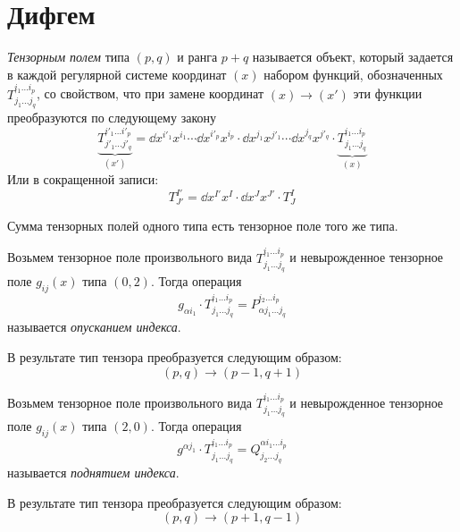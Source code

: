 \documentclass{article}
\begin{document}
\section{Дифгем}
\begin{definition}
    \emph{Тензорным полем} типа $(p, q)$ и ранга $p+q$ называется объект, который задается в каждой регулярной системе координат $(x)$ набором функций, обозначенных $T_{j_1 \ldots j_q}^{i_1 \ldots i_p}$, со свойством, что при замене координат $(x)\to (x')$ эти функции преобразуются по следующему закону
    $$\underbrace{T_{j'_1 \ldots j'_q}^{i'_1 \ldots i'_p}}_{(x')} = \dd{x^{i'_1}}{x^{i_1}} \cdots \dd{x^{i'_p}}{x^{i_p}} \cdot \dd{x^{j_1}}{x^{j'_1}} \cdots \dd{x^{j_q}}{x^{j'_q}} \cdot \underbrace{T_{j_1 \ldots j_q}^{i_1 \ldots i_p}}_{(x)}$$
    Или в сокращенной записи:
    $$T_{J'}^{I'} = \dd{x^{I'}}{x^I} \cdot \dd{x^J}{x^{J'}} \cdot T_J^I$$
\end{definition}


\begin{theorem}
    Сумма тензорных полей одного типа есть тензорное поле того же типа.
\end{theorem}


\begin{definition}
    Возьмем тензорное поле произвольного вида $T_{j_1 \ldots j_q}^{i_1 \ldots i_p}$
    и невырожденное тензорное поле $g_{ij}(x)$ типа $(0,2)$. Тогда операция
    $$g_{\alpha i_1} \cdot T_{j_1 \ldots j_q}^{i_1 \ldots i_p} = P_{\alpha j_1 \ldots j_q}^{i_2 \ldots i_p}$$
    называется \emph{опусканием индекса}.

    В результате тип тензора преобразуется следующим образом:
    $$(p,q) \to (p-1, q+1)$$
\end{definition}

\begin{definition}
    Возьмем тензорное поле произвольного вида $T_{j_1 \ldots j_q}^{i_1 \ldots i_p}$ и невырожденное тензорное поле $g_{ij}(x)$ типа $(2,0)$. Тогда операция
    $$g^{\alpha j_1} \cdot T_{j_1 \ldots j_q}^{i_1 \ldots i_p} = Q_{j_2 \ldots j_q}^{\alpha i_1 \ldots i_p}$$
    называется \emph{поднятием индекса}.

    В результате тип тензора преобразуется следующим образом:
    $$(p,q) \to (p+1, q-1)$$
\end{definition}
\end{document}
